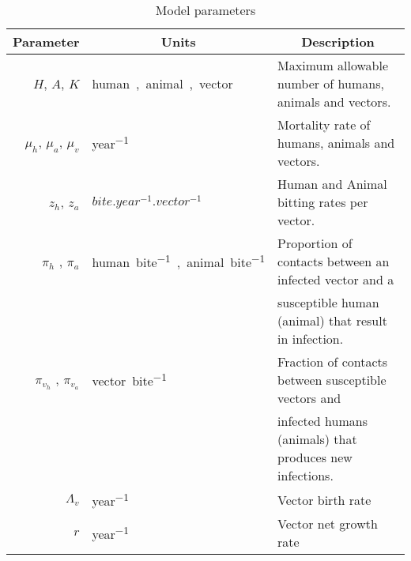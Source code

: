 \begin{table}[htb]
	\centering
	\caption{Model parameters}
	\label{tbl:parameter_definition}
	\begin{tabular}{@{}rll@{}}
		\toprule
		\multicolumn{1}{c}{Parameter} & \multicolumn{1}{c}{Units}
		&\multicolumn{1}{c}{Description}
		\\ 
		\midrule
		$H$, $A$, $K$										& \si{human, animal, vector}
		& Maximum allowable number of humans, animals and vectors.
		\\
		$\mu_{h}$, $\mu_a$, $\mu_v$		& \si{year^{-1}}														& 
		Mortality rate of humans, animals and vectors.
		\\
		$z_{h}$, $z_{a}$								& $\si{bite.year^{-1}.vector^{-1}}$					
		& 
		Human and Animal bitting rates per vector.
		\\ 
		$\pi_h$ , $\pi_a$						&\si{human.bite^{-1}, 
		animal.bite^{-1}}												& 
		Proportion of contacts between an infected vector and a 
		\\
		&&
		susceptible human (animal) that result in infection.
		\\
		$\pi_{v_{h}}$ , $\pi_{v_{a}}$							
		&\si{vector.bite^{-1}}											& 
		Fraction of contacts between susceptible vectors and 
		\\
		&&
		infected humans (animals) that produces new infections.
		\\
		$\Lambda_v$										&\si{year^{-1}}														& 
		Vector birth rate
		\\
		$r$														&\si{year^{-1}} 
		& Vector net growth rate
		\\
		\bottomrule
	\end{tabular}
\end{table}